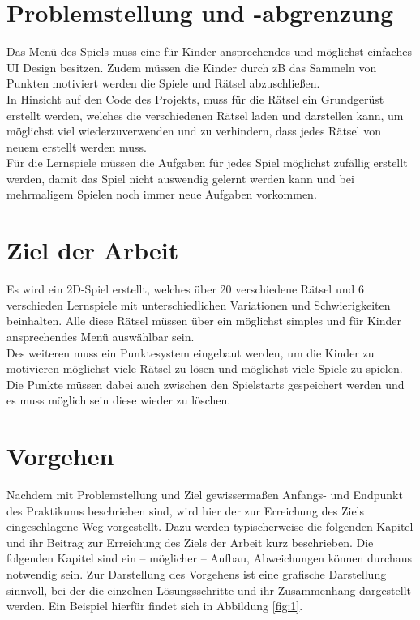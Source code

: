 \section{Problemstellung und -abgrenzung}
\label{sec:problemstellung}

Das Menü des Spiels muss eine für Kinder ansprechendes und möglichst einfaches UI Design besitzen. Zudem müssen die Kinder durch zB das Sammeln von Punkten motiviert werden die Spiele und Rätsel abzuschließen.\\

In Hinsicht auf den Code des Projekts, muss für die Rätsel ein Grundgerüst erstellt werden, welches die verschiedenen Rätsel laden und darstellen kann, um möglichst viel wiederzuverwenden und zu verhindern, dass jedes Rätsel von neuem erstellt werden muss.\\

Für die Lernspiele müssen die Aufgaben für jedes Spiel möglichst zufällig erstellt werden, damit das Spiel nicht auswendig gelernt werden kann und bei mehrmaligem Spielen noch immer neue Aufgaben vorkommen.

\section{Ziel der Arbeit}
\label{sec:ziel}

Es wird ein 2D-Spiel erstellt, welches über 20 verschiedene Rätsel und 6 verschieden Lernspiele mit unterschiedlichen Variationen und Schwierigkeiten beinhalten. Alle diese Rätsel müssen über ein möglichst simples und für Kinder ansprechendes Menü auswählbar sein.\\
Des weiteren muss ein Punktesystem eingebaut werden, um die Kinder zu motivieren möglichst viele Rätsel zu lösen und möglichst viele Spiele zu spielen. Die Punkte müssen dabei auch zwischen den Spielstarts gespeichert werden und es muss möglich sein diese wieder zu löschen.

\section{Vorgehen}
\label{sec:vorgehen}

Nachdem mit Problemstellung und Ziel gewissermaßen Anfangs- und Endpunkt 
des Praktikums beschrieben sind, wird hier der zur Erreichung des Ziels 
eingeschlagene Weg vorgestellt. Dazu werden typischerweise die folgenden 
Kapitel und ihr Beitrag zur Erreichung des Ziels der Arbeit kurz 
beschrieben. Die folgenden Kapitel sind ein – möglicher – Aufbau, 
Abweichungen können durchaus notwendig sein. Zur Darstellung des 
Vorgehens ist eine grafische Darstellung sinnvoll, bei der die einzelnen 
Lösungsschritte und ihr Zusammenhang dargestellt werden. Ein Beispiel 
hierfür findet sich in Abbildung \ref{fig:1}.

